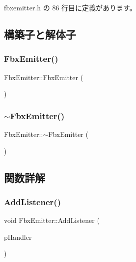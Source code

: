  fbxemitter.\+h の 86 行目に定義があります。



\subsection{構築子と解体子}
\mbox{\label{class_fbx_emitter_a33a5aeaa15dd8c9fa66a97b3ab5db550}} 
\subsubsection{\texorpdfstring{Fbx\+Emitter()}{FbxEmitter()}}
{\footnotesize\ttfamily Fbx\+Emitter\+::\+Fbx\+Emitter (\begin{DoxyParamCaption}{ }\end{DoxyParamCaption})}

\mbox{\label{class_fbx_emitter_a58a10b2780c916dedd3ddbbf7ad62f3a}} 
\subsubsection{\texorpdfstring{$\sim$\+Fbx\+Emitter()}{~FbxEmitter()}}
{\footnotesize\ttfamily Fbx\+Emitter\+::$\sim$\+Fbx\+Emitter (\begin{DoxyParamCaption}{ }\end{DoxyParamCaption})}



\subsection{関数詳解}
\mbox{\label{class_fbx_emitter_ab8022a1fd620467f12f493673cfa16a9}} 
\subsubsection{\texorpdfstring{Add\+Listener()}{AddListener()}}
{\footnotesize\ttfamily void Fbx\+Emitter\+::\+Add\+Listener (\begin{DoxyParamCaption}\item[{\hyperlink{class_fbx_event_handler}{Fbx\+Event\+Handler} \&}]{p\+Handler }\end{DoxyParamCaption})}

